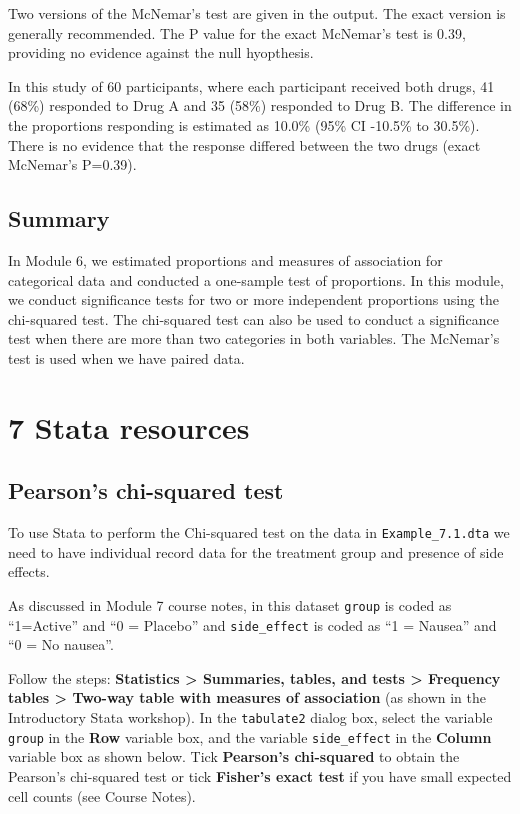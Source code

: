 \documentclass[
]{memoir}
\begin{document}
Two versions of the McNemar's test are given in the output. The exact version is generally recommended. The P value for the exact McNemar's test is 0.39, providing no evidence against the null hyopthesis.

In this study of 60 participants, where each participant received both drugs, 41 (68\%) responded to Drug A and 35 (58\%) responded to Drug B. The difference in the proportions responding is estimated as 10.0\% (95\% CI -10.5\% to 30.5\%). There is no evidence that the response differed between the two drugs (exact McNemar's P=0.39).

\hypertarget{summary}{%
\section{Summary}\label{summary}}

In Module 6, we estimated proportions and measures of association for categorical data and conducted a one-sample test of proportions. In this module, we conduct significance tests for two or more independent proportions using the chi-squared test. The chi-squared test can also be used to conduct a significance test when there are more than two categories in both variables. The McNemar's test is used when we have paired data.

\hypertarget{stata-resources}{%
\chapter*{\texorpdfstring{\textbf{7} Stata resources}{7 Stata resources}}\label{stata-resources}}

\hypertarget{pearsons-chi-squared-test}{%
\section{Pearson's chi-squared test}\label{pearsons-chi-squared-test}}

To use Stata to perform the Chi-squared test on the data in \texttt{Example\_7.1.dta} we need to have individual record data for the treatment group and presence of side effects.

As discussed in Module 7 course notes, in this dataset \texttt{group} is coded as ``1=Active'' and ``0 = Placebo'' and \texttt{side\_effect} is coded as ``1 = Nausea'' and ``0 = No nausea''.

Follow the steps: \textbf{Statistics \textgreater{} Summaries, tables, and tests \textgreater{} Frequency tables \textgreater{} Two-way table with measures of association} (as shown in the Introductory Stata workshop). In the \texttt{tabulate2} dialog box, select the variable \texttt{group} in the \textbf{Row} variable box, and the variable \texttt{side\_effect} in the \textbf{Column} variable box as shown below. Tick \textbf{Pearson's chi-squared} to obtain the Pearson's chi-squared test or tick \textbf{Fisher's exact test} if you have small expected cell counts (see Course Notes).
\end{document}
